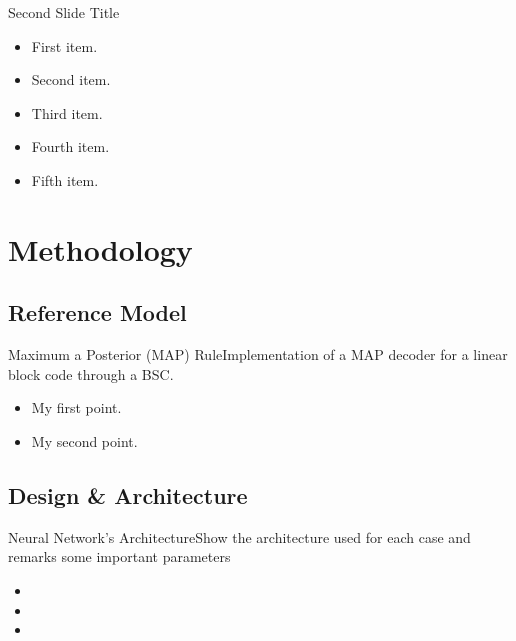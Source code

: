 \documentclass{beamer}
\begin{document}
\begin{frame}{Second Slide Title}
  \begin{itemize}
  \item {
    First item.
    \pause %
  }
  \item {   
    Second item.
  }
  \item<3-> {
    Third item.
  }
  \item<4-> {
    Fourth item.
  }
  \item<5-> {
    Fifth item. 
  }
  \end{itemize}
\end{frame}


\section{Methodology}

\subsection{Reference Model}
\begin{frame}{Maximum a Posterior (MAP) Rule}{Implementation of a MAP decoder for a linear block code through a BSC.}
  \begin{itemize}
  \item {
    My first point.
  }
  \item {
    My second point.
  }
  \end{itemize}
\end{frame}

\subsection{Design \& Architecture}
\begin{frame}{Neural Network's Architecture}{Show the architecture used for each case and remarks some important parameters}
  \begin{itemize}
  \item {
    
  }
  \item {
    
  }
  \item {
    
  }
  \end{itemize}
\end{frame}
\end{document}
